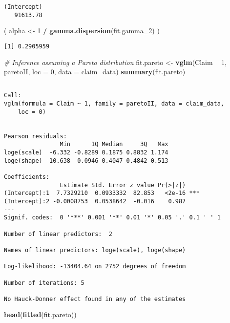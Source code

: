 \documentclass[]{book}
\newenvironment{Shaded}{\begin{snugshade}}{\end{snugshade}}
\newcommand{\KeywordTok}[1]{\textcolor[rgb]{0.13,0.29,0.53}{\textbf{#1}}}
\newcommand{\DataTypeTok}[1]{\textcolor[rgb]{0.13,0.29,0.53}{#1}}
\newcommand{\DecValTok}[1]{\textcolor[rgb]{0.00,0.00,0.81}{#1}}
\newcommand{\StringTok}[1]{\textcolor[rgb]{0.31,0.60,0.02}{#1}}
\newcommand{\CommentTok}[1]{\textcolor[rgb]{0.56,0.35,0.01}{\textit{#1}}}
\newcommand{\OperatorTok}[1]{\textcolor[rgb]{0.81,0.36,0.00}{\textbf{#1}}}
\newcommand{\NormalTok}[1]{#1}
\theoremstyle{definition}
\theoremstyle{definition}
\theoremstyle{definition}
\theoremstyle{remark}
\begin{document}
\begin{verbatim}
(Intercept) 
   91613.78 
\end{verbatim}

\begin{Shaded}
\begin{Highlighting}[]
\NormalTok{( alpha <-}\StringTok{ }\DecValTok{1} \OperatorTok{/}\StringTok{ }\KeywordTok{gamma.dispersion}\NormalTok{(fit.gamma_}\DecValTok{2}\NormalTok{) )}
\end{Highlighting}
\end{Shaded}

\begin{verbatim}
[1] 0.2905959
\end{verbatim}

\begin{Shaded}
\begin{Highlighting}[]
\CommentTok{# Inference assuming a Pareto distribution}
\NormalTok{fit.pareto <-}\StringTok{ }\KeywordTok{vglm}\NormalTok{(Claim }\OperatorTok{~}\StringTok{ }\DecValTok{1}\NormalTok{, paretoII, }\DataTypeTok{loc =} \DecValTok{0}\NormalTok{, }\DataTypeTok{data =}\NormalTok{ claim_data)}
\KeywordTok{summary}\NormalTok{(fit.pareto)}
\end{Highlighting}
\end{Shaded}

\begin{verbatim}

Call:
vglm(formula = Claim ~ 1, family = paretoII, data = claim_data, 
    loc = 0)


Pearson residuals:
                Min      1Q Median     3Q   Max
loge(scale)  -6.332 -0.8289 0.1875 0.8832 1.174
loge(shape) -10.638  0.0946 0.4047 0.4842 0.513

Coefficients: 
                Estimate Std. Error z value Pr(>|z|)    
(Intercept):1  7.7329210  0.0933332  82.853   <2e-16 ***
(Intercept):2 -0.0008753  0.0538642  -0.016    0.987    
---
Signif. codes:  0 '***' 0.001 '**' 0.01 '*' 0.05 '.' 0.1 ' ' 1

Number of linear predictors:  2 

Names of linear predictors: loge(scale), loge(shape)

Log-likelihood: -13404.64 on 2752 degrees of freedom

Number of iterations: 5 

No Hauck-Donner effect found in any of the estimates
\end{verbatim}

\begin{Shaded}
\begin{Highlighting}[]
\KeywordTok{head}\NormalTok{(}\KeywordTok{fitted}\NormalTok{(fit.pareto))}
\end{Highlighting}
\end{Shaded}
\end{document}
